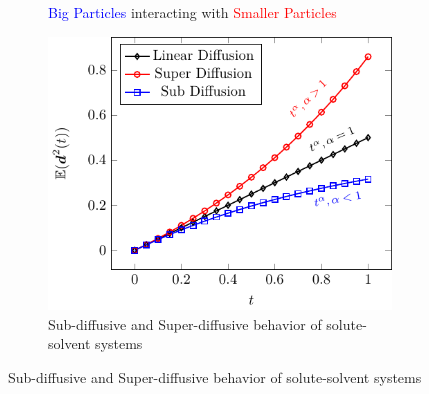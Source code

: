 \documentclass[a4paper,10pt]{beamer}
\begin{document}
\begin{frame}
\begin{minipage}{0.6\linewidth}
\begin{figure}[H]
\begin{subfigure}[b]{0.45\linewidth}
					\caption{\footnotesize \textcolor{blue}{Big Particles} interacting with \textcolor{red}{Smaller Particles}}
				\end{subfigure}
				\begin{subfigure}[b]{0.5\linewidth}
					\includegraphics[width=\linewidth]{./Plots/Diffusion.pdf}
					\caption{\footnotesize Sub-diffusive and Super-diffusive behavior of solute-solvent systems}
				\end{subfigure}
			\end{figure}
		\end{minipage}
	\end{frame}		
	
\end{document}
